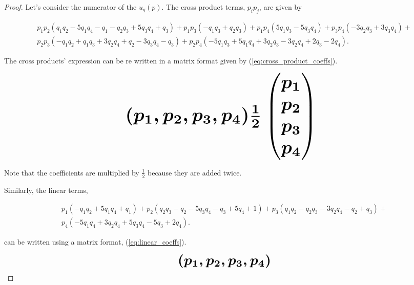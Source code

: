 \begin{proof}
Let's consider the numerator of the \(u_q(p)\). The cross product terms, \(p_ip_j\),
are given by

\begingroup
\footnotesize
\begin{align*}
p_{1} p_{2} (q_{1} q_{2} - 5 q_{1} q_{4} - q_{1} - q_{2} q_{3} + 5 q_{3} q_{4}
+ q_{3}) + p_{1} p_{3} (- q_{1} q_{3} + q_{2} q_{3}) + p_{1} p_{4} (5 q_{1} q_{3} -
5 q_{3} q_{4}) + p_{3} p_{4} (- 3 q_{2} q_{3} + 3 q_{3} q_{4}) +  \\
p_{2} p_{3} (- q_{1} q_{2} + q_{1} q_{3} + 3 q_{2} q_{4} + q_{2} - 3 q_{3} q_{4} - q_{3}) +
p_{2} p_{4} (- 5 q_{1} q_{3} + 5 q_{1} q_{4} + 3 q_{2} q_{3} - 3 q_{2} q_{4} +
2 q_{3} - 2 q_{4}).
\end{align*}
\endgroup

The cross products' expression can be re written in a matrix format given by
(\ref{eq:cross_product_coeffs}).

\begin{equation}\label{eq:cross_product_coeffs}
    \resizebox{0.8\linewidth}{!}{\arraycolsep=2.5pt%
    \boldmath\( 
    (p_1, p_2, p_3, p_4) \frac{1}{2}  \begin{pmatrix} 
    p_1 \\
    p_2 \\
    p_3 \\
    p_4 \end{pmatrix}
    \) }
\end{equation}

Note that the coefficients are multiplied by $\frac{1}{2}$ because they are
added twice.

Similarly, the linear terms,

\begingroup
\footnotesize
\begin{align*}
p_{1} (- q_{1} q_{2} + 5 q_{1} q_{4} + q_{1}) + p_{2} (q_{2} q_{3} - q_{2} - 5 q_{3} q_{4} - q_{3} + 5 q_{4} + 1) + p_{3} (q_{1} q_{2} - q_{2} q_{3} - 3 q_{2} q_{4} - q_{2} + q_{3}) + \\
p_{4} (- 5 q_{1} q_{4} + 3 q_{2} q_{4} + 5 q_{3} q_{4} - 5 q_{3} + 2 q_{4}).
\end{align*}
\endgroup

can be written using a matrix format, (\ref{eq:linear_coeffs}).

\begin{equation}\label{eq:linear_coeffs}
    \resizebox{0.38\linewidth}{!}{\arraycolsep=2.5pt%
    \boldmath\(
    (p_1, p_2, p_3, p_4) \)}
\end{equation}


\end{proof}
